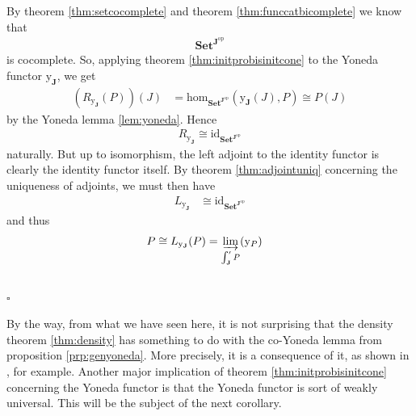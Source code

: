 \begin{prf}
By theorem \ref{thm:setcocomplete} and theorem \ref{thm:funccatbicomplete} we know that
\begin{align*}
  \mathbf{Set}^{\mathbf{J}^{\textrm{op}}}
\end{align*}
is cocomplete.
So, applying theorem \ref{thm:initprobisinitcone} to the Yoneda functor $\mathrm{y}_{\mathbf{J}}$, we get
\begin{align*}
  \left(
    R_{\mathrm{y}_{\mathbf{J}}}(P)
  \right)
  (J)
  &=
  \mathrm{hom}_{\mathbf{Set}^{\mathbf{J}^{\textrm{op}}}}
  \left(
    \mathrm{y}_{\mathbf{J}}(J),
    P
  \right)
  \cong
  P(J)
\end{align*}
by the Yoneda lemma \ref{lem:yoneda}.
Hence
\begin{align*}
  R_{\mathrm{y}_{\mathbf{J}}}
  \cong
  \mathrm{id}_{\mathbf{Set}^{\mathbf{J}^{\textrm{op}}}}
\end{align*}
naturally.
But up to isomorphism, the left adjoint to the identity functor is clearly the identity functor itself.
By theorem \ref{thm:adjointuniq} concerning the uniqueness of adjoints, we must then have
\begin{align*}
  L_{\mathrm{y}_{\mathbf{J}}}
  &\cong
  \mathrm{id}_{\mathbf{Set}^{\mathbf{J}^{\textrm{op}}}}
\end{align*}
and thus
\begin{align*}
  P
  &\cong
  L_{\mathrm{y}_{\mathbf{J}}}(P)
  =
  \varinjlim_{\int_{\mathbf{J}}^{\prime}P}(\mathrm{y}_{P})
\end{align*}
\\
\phantom{proven}
\hfill
$\square$
\end{prf}
By the way, from what we have seen here, it is not surprising that the density theorem \ref{thm:density} has something to do with the co-Yoneda lemma from proposition \ref{prp:genyoneda}.
More precisely, it is a consequence of it, as shown in \cite{52fbba46}, for example.
Another major implication of theorem \ref{thm:initprobisinitcone} concerning the Yoneda functor is that the Yoneda functor is sort of weakly universal.
This will be the subject of the next corollary.
\\

